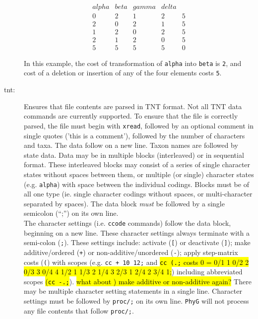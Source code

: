 \begin{description}
		\\
		\begin{equation}
		\begin{array}{lllll}
		alpha & beta & gamma & delta &  \\
		0 &   2 &  1 &   2 &   5 \\
		2 &   0 &  2 &   1 &   5 \\
		1 &   2 &  0 &   2 &   5 \\
		2 &   1 &  2 &   0 &   5 \\
		5 &   5 &  5 &   5 &   0
		\end{array}
		\end{equation} 

		In this example, the cost of transformation of \texttt{alpha} into \texttt{beta} is \texttt{2},
		and cost of a deletion or insertion of any of the four elements costs \texttt{5}.

		\item [tnt:] Ensures that file contents are parsed in TNT \citep{Goloboffetal2008} format. 
		Not all TNT data commands are currently supported. To ensure that the file is correctly
		parsed, the file must begin with \texttt{xread}, followed by an optional comment in single 
		quotes ('this is a comment'), followed by the number of characters and taxa. The data 
		follow on a new line. Taxon names are followed by state data. Data may be in multiple 
		blocks (interleaved) or in sequential format. These interleaved blocks may consist of a 
		series of single character states without spaces between them, or multiple (or single) 
		character states (e.g. \texttt{alpha}) with space between the individual codings. Blocks 
		must be of all one type (ie. single character codings without spaces, or multi-character 
		separated by spaces). The data block \textit{must} be followed by a single semicolon 
		(``;'') 	on its own line.\\
			
		The character settings (i.e. \texttt{ccode} commands) follow the data block, beginning 
		on a 	new line. These character settings always terminate with a semi-colon (\texttt{;}). 
		These settings include: activate (\texttt{[}) or deactivate (\texttt{]}); make additive/ordered 
		(\texttt{+}) 	or non-additive/unordered (\texttt{-}); apply step-matrix costs (\texttt{(}) with 
		scopes (e.g. \texttt{cc + 10 12;} and  \hl{\texttt{cc (.;} costs 0 = 0/1 1 0/2 2 0/3 3 0/4 4 1/2 1 
		1/3 2 1/4 3 2/3 1 2/4 2 3/4 1;}) including abbreviated scopes \hl{(\texttt{cc -.;}}). \hl{what 
		about ) make additive or non-additive again?} There may 
		be multiple character setting statements in a single line. Character settings must be 
		followed by \texttt{proc/;} on its own line. \texttt{PhyG} will not process
		any file contents that follow \texttt{proc/;}.
		  

\end{description}
